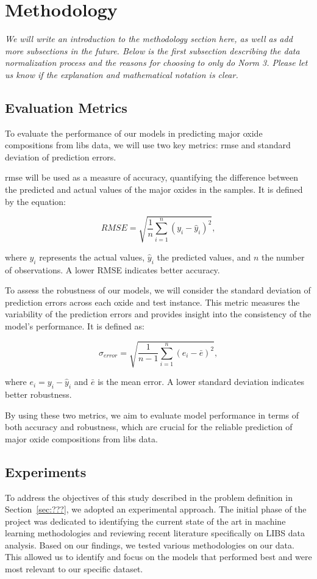 \section{Methodology}\label{sec:methodology}
\textit{We will write an introduction to the methodology section here, as well as add more subsections in the future. Below is the first subsection describing the data normalization process and the reasons for choosing to only do Norm 3. Please let us know if the explanation and mathematical notation is clear.}

\subsection{Evaluation Metrics}
To evaluate the performance of our models in predicting major oxide compositions from \gls{libs} data, we will use two key metrics: \gls{rmse} and standard deviation of prediction errors.

\gls{rmse} will be used as a measure of accuracy, quantifying the difference between the predicted and actual values of the major oxides in the samples. It is defined by the equation:

\begin{equation}
    RMSE = \sqrt{\frac{1}{n} \sum_{i=1}^{n} (y_i - \hat{y}_i)^2},
\end{equation}

where $y_i$ represents the actual values, $\hat{y}_i$ the predicted values, and $n$ the number of observations. A lower RMSE indicates better accuracy.

To assess the robustness of our models, we will consider the standard deviation of prediction errors across each oxide and test instance. This metric measures the variability of the prediction errors and provides insight into the consistency of the model's performance. It is defined as:

\begin{equation}
    \sigma_{error} = \sqrt{\frac{1}{n-1} \sum_{i=1}^{n} (e_i - \bar{e})^2},
\end{equation}

where $e_i = y_i - \hat{y}_i$ and $\bar{e}$ is the mean error. A lower standard deviation indicates better robustness.

By using these two metrics, we aim to evaluate model performance in terms of both accuracy and robustness, which are crucial for the reliable prediction of major oxide compositions from \gls{libs} data.

\subsection{Experiments}
To address the objectives of this study described in the problem definition in Section~\ref{sec:???}, we adopted an experimental approach.
The initial phase of the project was dedicated to identifying the current state of the art in machine learning methodologies and reviewing recent literature specifically on LIBS data analysis.
Based on our findings, we tested various methodologies on our data.
This allowed us to identify and focus on the models that performed best and were most relevant to our specific dataset.

